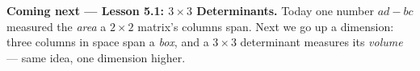 \documentclass[10pt]{article}
\begin{document}
\begin{spiralbox}
\textbf{Coming next --- Lesson 5.1: $3\times3$ Determinants.} Today one number $ad-bc$ measured the
\emph{area} a $2\times2$ matrix's columns span. Next we go up a dimension: three columns in space
span a \emph{box}, and a $3\times3$ determinant measures its \emph{volume} --- same idea, one
dimension higher.
\end{spiralbox}
\end{document}
